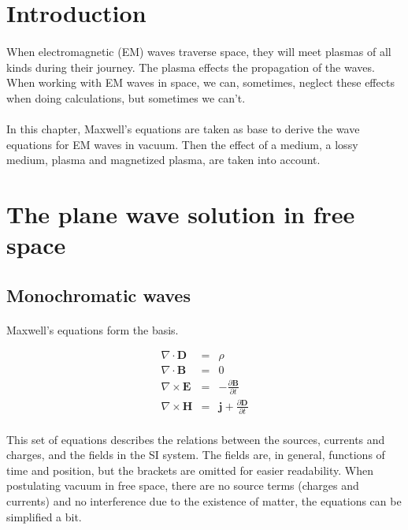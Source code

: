 \documentclass[a4paper,10pt]{thesis}
\begin{document}
\section{\textbf{Introduction}}

\paragraph*{}
When electromagnetic (EM) waves traverse space, they will meet plasmas of all kinds during their journey. The plasma effects the propagation of the waves. When working with EM waves in space, we can, sometimes, neglect these effects when doing calculations, but sometimes we can't.

\paragraph*{}
In this chapter, Maxwell's equations are taken as base to derive the wave equations for EM waves in vacuum. Then the effect of a medium, a lossy medium, plasma and magnetized plasma, are taken into account.

\section{\textbf{The plane wave solution in free space}}
\subsection{Monochromatic waves}
\paragraph*{}
Maxwell's equations form the basis.

\begin{eqnarray}
\nabla \cdot \mathbf{D}&=&\rho \label{maxwell1}\\
\nabla \cdot \mathbf{B}&=&0 \label{maxwell2} \\
\nabla \times \mathbf{E}&=&-\frac{\partial \mathbf{B}}{\partial t} \label{maxwell3} \\
\nabla \times \mathbf{H}&=&\mathbf{j}+ \frac{\partial \mathbf{D}}{\partial t} \label{maxwell4}
\end{eqnarray}

\paragraph*{}
This set of equations describes the relations between the sources, currents and charges, and the fields in the SI system. The fields are, in general, functions of time and position, but the brackets are omitted for easier readability. When postulating vacuum in free space, there are no source terms (charges and currents) and no interference due to the existence of matter, the equations can be simplified a bit.
\end{document}
